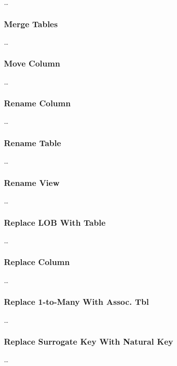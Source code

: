 \documentclass{acm_proc_article-sp}
\begin{document}
\ldots

\subsubsection{Merge Tables}

\ldots

\subsubsection{Move Column}

\ldots

\subsubsection{Rename Column}

\ldots

\subsubsection{Rename Table}

\ldots

\subsubsection{Rename View}

\ldots

\subsubsection{Replace LOB With Table}

\ldots

\subsubsection{Replace Column}

\ldots

\subsubsection{Replace 1-to-Many With Assoc. Tbl}

\ldots

\subsubsection{Replace Surrogate Key With Natural Key}

\ldots
\end{document}
